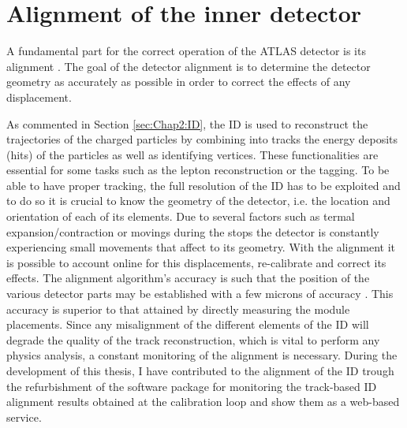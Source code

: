 \section{Alignment of the inner detector}
\label{sec:Chap2:ID_alignement}
A fundamental part for the correct operation of the ATLAS detector is its alignment \cite{ATLAS:2020ixw}. The goal of
the detector alignment is to determine the detector geometry as accurately as possible in order to
correct the effects of any displacement. %


As commented in Section \ref{sec:Chap2:ID}, the ID is used to reconstruct the 
trajectories of the charged particles by combining into tracks the energy deposits
(hits) of the particles as well as identifying  vertices. 
These functionalities are essential for some tasks such as the lepton reconstruction
or the \bjet tagging. To be able to have proper tracking, the full resolution of the ID has to be exploited and
to do so it is crucial to know the geometry of the detector, i.e. the location and
orientation of each of its elements. Due to several factors such as termal 
expansion/contraction or movings during the stops %
the detector is constantly experiencing small movements that affect to its geometry. 
With the alignment it is possible to account online for this displacements, re-calibrate and correct its effects. %
The alignment algorithm's accuracy is such that the position of the various detector parts may be established with a few microns of accuracy \cite{ATLAS:1999vwa}.  
This accuracy is superior to that attained by directly measuring the module placements. 
Since any misalignment of the different elements of the ID will degrade the quality of the track reconstruction, 
which is vital to perform any physics analysis, a constant monitoring of the alignment is necessary.
During the development of this thesis, I have contributed to the alignment of the ID trough the refurbishment 
of the software package for monitoring the track-based ID alignment results obtained at the calibration 
loop and show them as a web-based service.  


